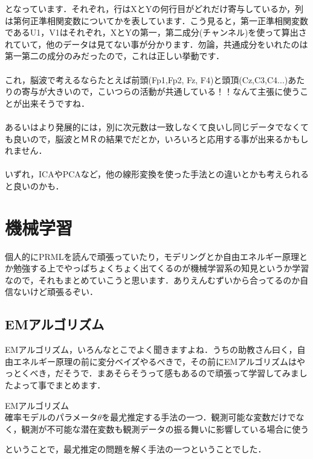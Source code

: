 \documentclass[11pt,a4paper]{ujreport}
\begin{document}
となっています．それぞれ，行はXとYの何行目がどれだけ寄与しているか，列は第何正準相関変数についてかを表しています．こう見ると，第一正準相関変数であるU1，V1はそれぞれ，XとYの第一，第二成分(チャンネル)を使って算出されていて，他のデータは見てない事が分かります．勿論，共通成分をいれたのは第一第二の成分のみだったので，これは正しい挙動です．\\
\\

これ，脳波で考えるならたとえば前頭(Fp1,Fp2, Fz, F4)と頭頂(Cz,C3,C4...)あたりの寄与が大きいので，こいつらの活動が共通している！！なんて主張に使うことが出来そうですね．\\\\

あるいはより発展的には，別に次元数は一致しなくて良いし同じデータでなくても良いので，脳波とＭＲの結果でだとか，いろいろと応用する事が出来るかもしれません．\\\\

いずれ，ICAやPCAなど，他の線形変換を使った手法との違いとかも考えられると良いのかも．


\chapter{機械学習}
個人的にPRMLを読んで頑張っていたり，モデリングとか自由エネルギー原理とか勉強する上でやっぱちょくちょく出てくるのが機械学習系の知見というか学習なので，それもまとめていこうと思います．ありえんむずいから合ってるのか自信ないけど頑張るぞい．

\section{EMアルゴリズム}
EMアルゴリズム，いろんなとこでよく聞きますよね．うちの助教さん曰く，自由エネルギー原理の前に変分ベイズやるべきで，その前にEMアルゴリズムはやっとくべき，だそうで．まあそらそうって感もあるので頑張って学習してみましたよって事でまとめます．\\

\begin{screen}
  EMアルゴリズム\\
  確率モデルのパラメータ$\theta$を最尤推定する手法の一つ．観測可能な変数だけでなく，観測が不可能な潜在変数も観測データの振る舞いに影響している場合に使う
\end{screen}

ということで，最尤推定の問題を解く手法の一つということでした．\\
\end{document}
